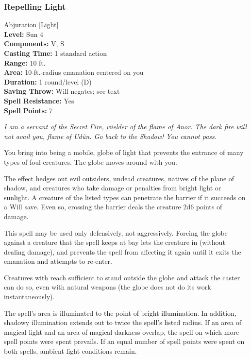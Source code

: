 \subsubsection{Repelling Light}
\label{Spell:RepellingLight}
Abjuration [Light]
\\ \textbf{Level:} Sun 4
\\ \textbf{Components:} V, S
\\ \textbf{Casting Time:} 1 standard action
\\ \textbf{Range:} 10 ft.
\\ \textbf{Area:} 10-ft.-radius emanation centered on you
\\ \textbf{Duration:} 1 round/level (D)
\\ \textbf{Saving Throw:} Will negates; see text
\\ \textbf{Spell Resistance:} Yes
\\ \textbf{Spell Points:} 7

\emph{I am a servant of the Secret Fire, wielder of the flame of Anor. The dark fire will not avail you, flame of Udûn. Go back to the Shadow! You cannot pass.} 

You bring into being a mobile, globe of light that prevents the entrance of many types of foul creatures.
The globe moves around with you.

The effect hedges out evil outsiders, undead creatures, natives of the plane of shadow, and creatures who take damage or penalties from bright light or sunlight. A creature of the listed types can penetrate the barrier if it succeeds on a Will save. 
Even so, crossing the barrier deals the creature 2d6 points of damage.

This spell may be used only defensively, not aggressively. Forcing the globe against a creature that the spell keeps at bay lets the creature in (without dealing damage), and prevents the spell from affecting it again until it exits the emanation and attempts to re-enter.

Creatures with reach sufficient to stand outside the globe and attack the caster can do so, even with natural weapons (the globe does not do its work instantaneously).

The spell's area is illuminated to the point of bright illumination. In addition, shadowy illumination extends out to twice the spell's listed radius.
If an area of magical light and an area of magical darkness overlap, the spell on which more spell points were spent prevails.
If an equal number of spell points were spent on both spells, ambient light conditions remain.

